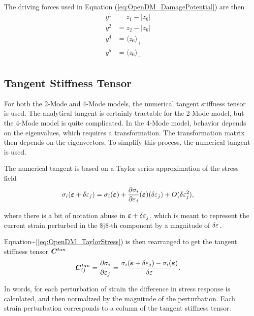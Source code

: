 \documentclass[11pt]{article}
\begin{document}
The driving forces used in Equation (\ref{eq:OpenDM_DamagePotential})
are then
\begin{equation}
  \label{eq:OpenDM4_DrivingForces}
  \begin{split}
    y^1 &= z_1 - |z_6| \\ 
    y^2 &= z_2 - |z_6| \\ 
    y^4 &= \langle z_6 \rangle_+ \\ 
    y^5 &= \langle z_6 \rangle_- \\ 
  \end{split}
\end{equation}

\subsection{Tangent Stiffness Tensor}
\label{sec:org6cca6b1}
For both the 2-Mode and 4-Mode models, the numerical tangent stiffness
tensor is used. The analytical tangent is certainly tractable for the
2-Mode model, but the 4-Mode model is quite complicated. In the 4-Mode
model, behavior depends on the eigenvalues, which requires a
transformation. The transformation matrix then depends on the
eigenvectors. To simplify this process, the numerical tangent is used.

The numerical tangent is based on a Taylor series approximation of the
stress field
\begin{equation}
  \label{eq:OpenDM_TaylorStress}
  \sigma_{i} (\bm{\varepsilon} + \delta \varepsilon_{j}) =
  \sigma_{i} (\bm{\varepsilon}) +
  \frac{\partial \sigma_{i}}{\partial \varepsilon_{j}} (\bm{\varepsilon})
  (\delta \varepsilon_{j}) + O(\delta \varepsilon_{j}^2),
\end{equation}

where there is a bit of notation abuse in
\(\bm{\varepsilon} + \delta \varepsilon_{j}\), which is meant to represent the
current strain perturbed in the \$j\$-th component by a magnitude of
\(\delta \varepsilon_{}\).

Equation\textasciitilde{}(\ref{eq:OpenDM_TaylorStress}) is then rearranged to get the
tangent stiffness tensor \(\bm{C}^{tan}\)
\begin{equation}
  \label{eq:OpenDM_NumTang}
  \bm{C}_{ij}^{tan} = \frac{\partial \sigma_{i}}{\partial \varepsilon_{j}} =
  \frac{\sigma_{i} (\bm{\varepsilon} + \delta \varepsilon_{j}) - \sigma_{i} (\bm{\varepsilon})}{
    \delta \varepsilon_{}}.
\end{equation}

In words, for each perturbation of strain the difference in stress
response is calculated, and then normalized by the magnitude of
the perturbation. Each strain perturbation corresponds to a column of
the tangent stiffness tensor.
\end{document}
